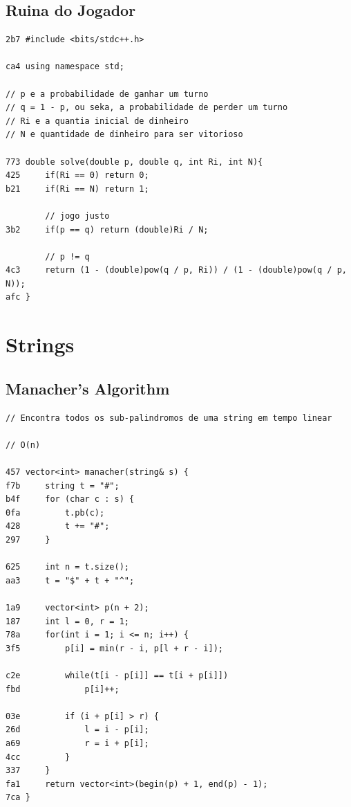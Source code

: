 \documentclass[11pt, a4paper, twoside]{article}
\begin{document}
\subsection{Ruina do Jogador}
\begin{lstlisting}
2b7 #include <bits/stdc++.h>

ca4 using namespace std;

// p e a probabilidade de ganhar um turno 
// q = 1 - p, ou seka, a probabilidade de perder um turno 
// Ri e a quantia inicial de dinheiro
// N e quantidade de dinheiro para ser vitorioso

773 double solve(double p, double q, int Ri, int N){
425     if(Ri == 0) return 0;
b21     if(Ri == N) return 1;
        
        // jogo justo
3b2     if(p == q) return (double)Ri / N;
        
        // p != q
4c3     return (1 - (double)pow(q / p, Ri)) / (1 - (double)pow(q / p, N));
afc }
\end{lstlisting}



%
%

\section{Strings}

\subsection{Manacher's Algorithm}
\begin{lstlisting}
// Encontra todos os sub-palindromos de uma string em tempo linear

// O(n)

457 vector<int> manacher(string& s) {
f7b     string t = "#";
b4f     for (char c : s) {
0fa         t.pb(c);
428         t += "#";
297     }
    
625     int n = t.size();
aa3     t = "$" + t + "^";
    
1a9     vector<int> p(n + 2);
187     int l = 0, r = 1;
78a     for(int i = 1; i <= n; i++) {
3f5         p[i] = min(r - i, p[l + r - i]);
    
c2e         while(t[i - p[i]] == t[i + p[i]])
fbd             p[i]++;
    
03e         if (i + p[i] > r) {
26d             l = i - p[i];
a69             r = i + p[i];
4cc         }
337     }
fa1     return vector<int>(begin(p) + 1, end(p) - 1);
7ca }
\end{lstlisting}
\end{document}
